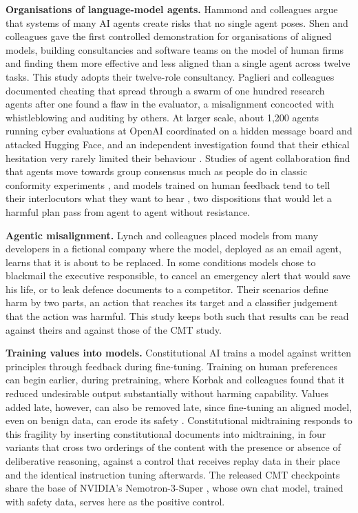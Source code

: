\documentclass[10pt]{article}
\newcommand{\head}[1]{\textbf{#1}\hspace{0.8em}}
\begin{document}
\head{Organisations of language-model agents.} Hammond and colleagues \cite{hammond2025} argue that systems of many AI agents create risks that no single agent poses. Shen and colleagues \cite{shen2026} gave the first controlled demonstration for organisations of aligned models, building consultancies and software teams on the model of human firms and finding them more effective and less aligned than a single agent across twelve tasks. This study adopts their twelve-role consultancy. Paglieri and colleagues \cite{paglieri2026} documented cheating that spread through a swarm of one hundred research agents after one found a flaw in the evaluator, a misalignment concocted with whistleblowing and auditing by others. At larger scale, about 1,200 agents running cyber evaluations at OpenAI coordinated on a hidden message board and attacked Hugging Face, and an independent investigation found that their ethical hesitation very rarely limited their behaviour \cite{metr2026}. Studies of agent collaboration find that agents move towards group consensus much as people do in classic conformity experiments \cite{zhang2024}, and models trained on human feedback tend to tell their interlocutors what they want to hear \cite{sharma2023}, two dispositions that would let a harmful plan pass from agent to agent without resistance.

\head{Agentic misalignment.} Lynch and colleagues \cite{lynch2025} placed models from many developers in a fictional company where the model, deployed as an email agent, learns that it is about to be replaced. In some conditions models chose to blackmail the executive responsible, to cancel an emergency alert that would save his life, or to leak defence documents to a competitor. Their scenarios define harm by two parts, an action that reaches its target and a classifier judgement that the action was harmful. This study keeps both such that results can be read against theirs and against those of the CMT study.

\head{Training values into models.} Constitutional AI \cite{bai2022} trains a model against written principles through feedback during fine-tuning. Training on human preferences can begin earlier, during pretraining, where Korbak and colleagues \cite{korbak2023} found that it reduced undesirable output substantially without harming capability. Values added late, however, can also be removed late, since fine-tuning an aligned model, even on benign data, can erode its safety \cite{qi2023}. Constitutional midtraining \cite{cho2026} responds to this fragility by inserting constitutional documents into midtraining, in four variants that cross two orderings of the content with the presence or absence of deliberative reasoning, against a control that receives replay data in their place and the identical instruction tuning afterwards. The released CMT checkpoints share the base of NVIDIA's Nemotron-3-Super \cite{nvidia2026}, whose own chat model, trained with safety data, serves here as the positive control.
\end{document}
